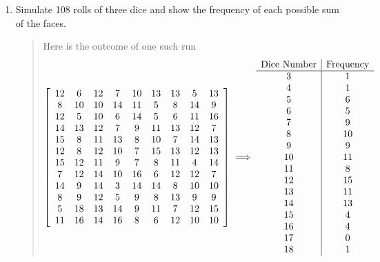 \documentclass{hw}
\begin{document}
\begin{enumerate}
\item Simulate 108 rolls of three dice and show the frequency of each possible sum of the faces.
\begin{quote}
Here is the outcome of one such run
\[
\left[
\begin{array}{c c c c c c c c c}
12 & 6 & 12 & 7 & 10 & 13 & 13 & 5 & 13\\
8 & 10 & 10 & 14 & 11 & 5 & 8 & 14 & 9\\
12 & 5 & 10 & 6 & 14 & 5 & 6 & 11 & 16\\
14 & 13 & 12 & 7 & 9 & 11 & 13 & 12 & 7\\
15 & 8 & 11 & 13 & 8 & 10 & 7 & 14 & 13\\
12 & 8 & 12 & 10 & 7 & 15 & 13 & 12 & 13\\
15 & 12 & 11 & 9 & 7 & 8 & 11 & 4 & 14\\
7 & 12 & 14 & 10 & 16 & 6 & 12 & 12 & 7\\
14 & 9 & 14 & 3 & 14 & 14 & 8 & 10 & 10\\
8 & 9 & 12 & 5 & 9 & 8 & 13 & 9 & 9\\
5 & 18 & 13 & 14 & 9 & 11 & 7 & 12 & 15\\
11 & 16 & 14 & 16 & 8 & 6 & 12 & 10 & 10\\
\end{array}
\right]
\implies
\begin{array}{c | c}
\text{Dice Number} & \text{Frequency}\\
\hline
3 & 1\\
4 & 1\\
5 & 6\\
6 & 5\\
7 & 9\\
8 & 10\\
9 & 9\\
10 & 11\\
11 & 8\\
12 & 15\\
13 & 11\\
14 & 13\\
15 & 4\\
16 & 4\\
17 & 0\\
18 & 1\\
\end{array}
\]
\end{quote}
\end{enumerate}
\end{document}
